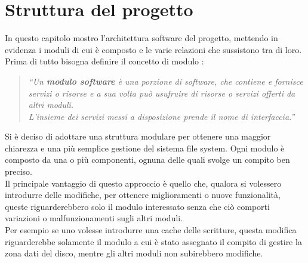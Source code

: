\chapter{Struttura del progetto}
\label{cap:Struttutra_Progetto}
In questo capitolo mostro l'architettura software del progetto, mettendo in
evidenza i moduli di cui è composto e le varie relazioni che sussistono tra di loro.\\
Prima di tutto bisogna definire il concetto di modulo :     
       \begin{quote}
       \textit{``Un \textbf{modulo software} è una porzione di software, che
	contiene e fornisce servizi o risorse e a sua volta può usufruire di risorse o
	servizi offerti da altri moduli.\\ L'insieme dei servizi 
	messi a disposizione prende il nome di \textit{interfaccia}.''}
       \end{quote}

Si è deciso di adottare una struttura modulare per ottenere una maggior
chiarezza e una più semplice gestione del sistema file system. 
Ogni modulo è composto da una o più componenti, ognuna delle quali svolge un compito
ben preciso. \\ 
Il principale vantaggio di questo approccio è quello che,  qualora si volessero
introdurre delle modifiche, per ottenere miglioramenti o nuove funzionalità, queste riguarderebbero solo 
il modulo interessato senza che ciò comporti variazioni o malfunzionamenti sugli altri moduli.\\
Per esempio se uno volesse introdurre una cache delle scritture, questa modifica
riguarderebbe solamente il modulo a cui è stato assegnato il compito di gestire
la zona dati del disco, mentre gli altri moduli non 
subirebbero modifiche. 

